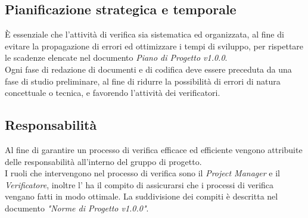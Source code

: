 \documentclass[12pt,a4paper,titlepage]{article}
\begin{document}
	\subsection{Pianificazione strategica e temporale}
	È essenziale che l'attività di verifica sia sistematica ed organizzata, al fine di evitare la propagazione di errori ed ottimizzare i tempi di sviluppo, per rispettare le scadenze elencate nel documento \textit{Piano di Progetto v1.0.0}.\\
	Ogni fase di redazione di documenti e di codifica deve essere preceduta da una fase di studio preliminare, al fine di ridurre la possibilità di errori di natura concettuale o tecnica, e favorendo l'attività dei verificatori.\\
	
	\subsection{Responsabilità}
	Al fine di garantire un processo di verifica efficace ed efficiente vengono attribuite delle responsabilità all'interno del gruppo di progetto.\\
	I ruoli che intervengono nel processo di verifica sono il \textit{Project Manager} e il \textit{Verificatore}, inoltre l' ha il compito di assicurarsi che i processi di verifica vengano fatti in modo ottimale. La suddivisione dei compiti è descritta nel documento \textit{"Norme di Progetto v1.0.0"}.
	
\end{document}
